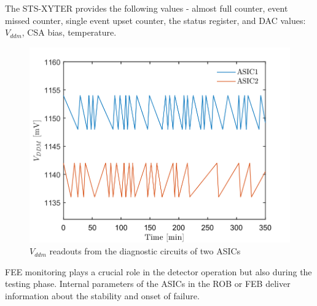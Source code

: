 The STS-XYTER provides the following values - almost full counter, event missed counter, single event upset counter, the status register, and \gls{DAC} values: $V_{ddm}$, \gls{CSA} bias, temperature. 

\begin{figure}[!h]
    \centering
    \includegraphics[width=0.65\columnwidth]{Chapter3/FEE/images/FEB.png}
    \caption{$V_{ddm}$ readouts from the diagnostic circuits of two ASICs}
    \label{fig:vddm_first}
\end{figure}

FEE monitoring plays a crucial role in the detector operation but also during the testing phase. Internal parameters of the ASICs in the \gls{ROB} or \gls{FEB} deliver information about the stability and onset of failure. %
